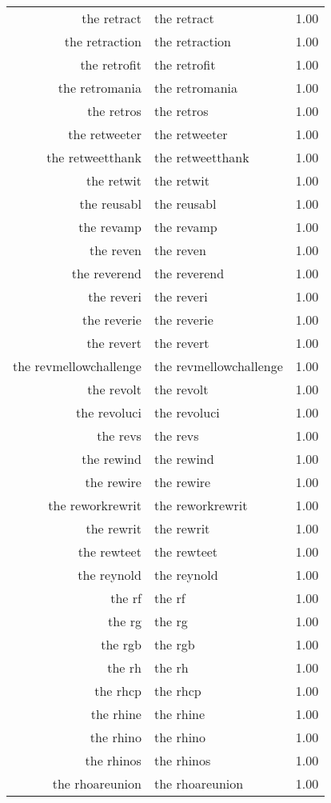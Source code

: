 \begin{table}[ht]
\begin{tabular}{rlr}
  the retract & the retract & 1.00 \\ 
  the retraction & the retraction & 1.00 \\ 
  the retrofit & the retrofit & 1.00 \\ 
  the retromania & the retromania & 1.00 \\ 
  the retros & the retros & 1.00 \\ 
  the retweeter & the retweeter & 1.00 \\ 
  the retweetthank & the retweetthank & 1.00 \\ 
  the retwit & the retwit & 1.00 \\ 
  the reusabl & the reusabl & 1.00 \\ 
  the revamp & the revamp & 1.00 \\ 
  the reven & the reven & 1.00 \\ 
  the reverend & the reverend & 1.00 \\ 
  the reveri & the reveri & 1.00 \\ 
  the reverie & the reverie & 1.00 \\ 
  the revert & the revert & 1.00 \\ 
  the revmellowchallenge & the revmellowchallenge & 1.00 \\ 
  the revolt & the revolt & 1.00 \\ 
  the revoluci & the revoluci & 1.00 \\ 
  the revs & the revs & 1.00 \\ 
  the rewind & the rewind & 1.00 \\ 
  the rewire & the rewire & 1.00 \\ 
  the reworkrewrit & the reworkrewrit & 1.00 \\ 
  the rewrit & the rewrit & 1.00 \\ 
  the rewteet & the rewteet & 1.00 \\ 
  the reynold & the reynold & 1.00 \\ 
  the rf & the rf & 1.00 \\ 
  the rg & the rg & 1.00 \\ 
  the rgb & the rgb & 1.00 \\ 
  the rh & the rh & 1.00 \\ 
  the rhcp & the rhcp & 1.00 \\ 
  the rhine & the rhine & 1.00 \\ 
  the rhino & the rhino & 1.00 \\ 
  the rhinos & the rhinos & 1.00 \\ 
  the rhoareunion & the rhoareunion & 1.00 \\ 

\end{tabular}
\end{table}
